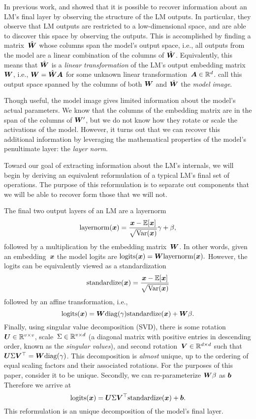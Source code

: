 \documentclass{article}
\newcommand\layernorm{\mathrm{layernorm}}
\newcommand\standardize{\mathrm{standardize}}
\newcommand\logits{\mathrm{logits}}
\newcommand\diag{\mathrm{diag}}
\begin{document}
In previous work, \citet{Finlayson2024LogitsOA} and \citet{Carlini2024StealingPO} showed that it is possible to recover information about an LM's final layer by observing the structure of the LM outputs.
In particular, they observe that LM outputs are restricted to a low-dimensional space, and are able to discover this space by observing the outputs.
This is accomplished by finding a matrix~\(\hat{{\bm{W}}}\) whose columns span the model's output space, i.e., all outputs from the model are a linear combination of the columns of \(\hat{{\bm{W}}}\).
Equivalently, this means that \(\hat{{\bm{W}}}\) is a \emph{linear transformation} of the LM's output embedding matrix~\({\bm{W}}\), i.e., \({\bm{W}}=\hat{{\bm{W}}}{\bm{A}}\) for some unknown linear transformation~\({\bm{A}}\in\mathbb{R}^d\).
\citeauthor{Finlayson2024LogitsOA} call this output space spanned by the columns of both \({\bm{W}}\) and \(\hat{{\bm{W}}}\) the \textit{model image}. 

Though useful, the model image gives limited information about the model's actual parameters.
We know that the columns of the embedding matrix are in the span of the columns of \({\bm{W}}'\),
but we do not know how they rotate or scale the activations of the model.
However, it turns out that we can recover this additional information by leveraging the mathematical properties of the model's penultimate layer: the \textit{layer norm}.

Toward our goal of extracting information about the LM's internals,
we will begin by deriving an equivalent reformulation 
of a typical LM's final set of operations.
The purpose of this reformulation is to separate out components 
that we will be able to recover form those that we will not.

The final two output layers of an LM are a layernorm
\[\layernorm(\vx)=\frac{\vx-\E[\vx]}{\sqrt{\Var(\vx)}}\gamma + \beta,\]
followed by a multiplication by the embedding matrix~\({\bm{W}}\). 
In other words, given an embedding~\({\bm{x}}\)
the model logits are \(\logits(\vx)=\mW\layernorm(\vx).\)
However, the logits can be equivalently viewed as a standardization
\[\standardize(\vx)=\frac{\vx-\E[\vx]}{\sqrt{\Var(\vx)}}\]
followed by an affine transformation, i.e.,
\[\logits(\vx)=\mW\diag(\gamma)\standardize(\vx) + \mW\beta.\]
Finally, using singular value decomposition (SVD),
there is some rotation~\({\bm{U}}\in\mathbb{R}^{v\times v}\),
scale~\(\Sigma\in\mathbb{R}^{v\times d}\) 
(a diagonal matrix with positive entries in descending order, known as the \emph{singular values}),
and second rotation~\({\bm{V}}\in\mathbb{R}^{d\times d}\)
such that \(\mU\Sigma\mV^\top=\mW\diag(\gamma)\).
This decomposition is \emph{almost} unique,
up to the ordering of equal scaling factors and their associated rotations.
For the purposes of this paper, consider it to be unique.
Secondly, we can re-parameterize \({\bm{W}}\beta\) as \({\bm{b}}\)
Therefore we arrive at 
\[\logits(\vx)=\mU\Sigma\mV^\top\standardize(\vx)+\vb.\]
This reformulation is an unique decomposition of the model's final layer.
\end{document}
